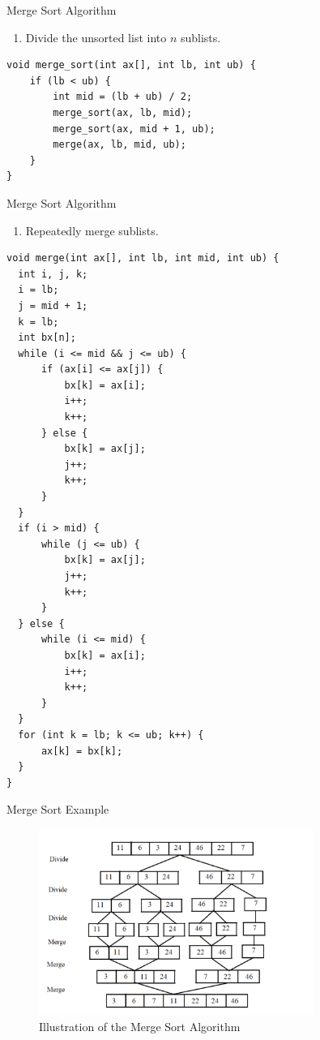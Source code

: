 \documentclass{beamer}
\begin{document}
\begin{frame}[fragile]{Merge Sort Algorithm}

  \begin{enumerate}
    \item Divide the unsorted list into \(n\) sublists.
  \end{enumerate}

  \begin{lstlisting}[caption={Merge Sort in C++}, label=mergeSortCode]
void merge_sort(int ax[], int lb, int ub) {
    if (lb < ub) {
        int mid = (lb + ub) / 2;
        merge_sort(ax, lb, mid);
        merge_sort(ax, mid + 1, ub);
        merge(ax, lb, mid, ub);
    }
}
    \end{lstlisting}

\end{frame}
\begin{frame}[fragile, shrink=10]{Merge Sort Algorithm}

  \begin{enumerate}
    \item Repeatedly merge sublists.
  \end{enumerate}

  \begin{lstlisting}[caption={Merge Sort in C++}, label=mergeSortCode]
void merge(int ax[], int lb, int mid, int ub) {
  int i, j, k;
  i = lb;
  j = mid + 1;
  k = lb;
  int bx[n];
  while (i <= mid && j <= ub) {
      if (ax[i] <= ax[j]) {
          bx[k] = ax[i];
          i++;
          k++;
      } else {
          bx[k] = ax[j];
          j++;
          k++;
      }
  }
  if (i > mid) {
      while (j <= ub) {
          bx[k] = ax[j];
          j++;
          k++;
      }
  } else {
      while (i <= mid) {
          bx[k] = ax[i];
          i++;
          k++;
      }
  }
  for (int k = lb; k <= ub; k++) {
      ax[k] = bx[k];
  }
}
  \end{lstlisting}

\end{frame}
\begin{frame}{Merge Sort Example}
  \begin{figure}
    \centering
    \includegraphics[width=0.8\textwidth]{graphics/merge.png}
    \caption{Illustration of the Merge Sort Algorithm}
  \end{figure}
\end{frame}
\end{document}
